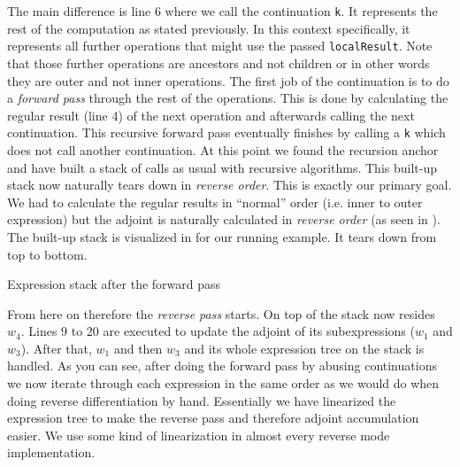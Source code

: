 The main difference is line 6 where we call the continuation \lstinline{k}. It represents the rest of the computation as stated previously. In this context specifically, it represents all further operations that might use the passed \lstinline{localResult}. Note that those further operations are ancestors and not children or in other words they are outer and not inner operations. The first job of the continuation is to do a \emph{forward pass} through the rest of the operations. This is done by calculating the regular result (line 4) of the next operation and afterwards calling the next continuation. This recursive forward pass eventually finishes by calling a \lstinline{k} which does not call another continuation. At this point we found the recursion anchor and have built a stack of calls as usual with recursive algorithms. This built-up stack now naturally tears down in \emph{reverse order}. This is exactly our primary goal. We had to calculate the regular results in ``normal'' order (i.e. inner to outer expression) but the adjoint is naturally calculated in \emph{reverse order} (as seen in ). The built-up stack is visualized in  for our running example. It tears down from top to bottom.
\begin{center}


    \captionsetup{type=figure}
    \caption{Expression stack after the forward pass}
    \label{fig:stack}
\end{center}
From here on therefore the \emph{reverse pass} starts. On top of the stack now resides $w_4$. Lines 9 to 20 are executed to update the adjoint of its subexpressions ($w_1$ and $w_3$). After that, $w_1$ and then $w_3$ and its whole expression tree on the stack is handled. As you can see, after doing the forward pass by abusing continuations we now iterate through each expression in the same order as we would do when doing reverse differentiation by hand. Essentially we have linearized the expression tree to make the reverse pass and therefore adjoint accumulation easier. We use some kind of linearization in almost every reverse mode implementation.

